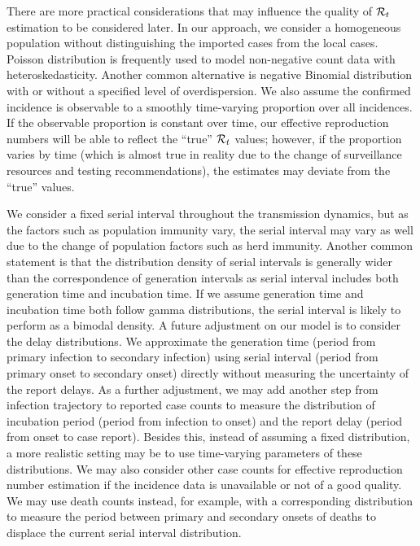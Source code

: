 


There are more practical considerations that may influence the quality of $\mathcal{R}_t$ estimation to be considered later. 
In our approach, we consider a homogeneous population without distinguishing the imported cases from the local cases. 
Poisson distribution is frequently used to model non-negative count data with heteroskedasticity. Another common alternative is negative Binomial distribution with or without a specified level of overdispersion. 
%
We also assume the confirmed incidence is observable to a smoothly time-varying proportion over all incidences. If the observable proportion is constant over time, our effective reproduction numbers will be able to reflect the ``true'' $\mathcal{R}_t$ values; however, if the proportion varies by time (which is almost true in reality due to the change of surveillance resources and testing recommendations), the estimates may deviate from the ``true'' values. 

We consider a fixed serial interval throughout the transmission dynamics, but as the factors such as population immunity vary, the serial interval may vary as well due to the change of population factors such as herd immunity. %
Another common statement is that the distribution density of serial intervals is generally wider than the correspondence of generation intervals as serial interval includes both generation time and incubation time. If we assume generation time and incubation time both follow gamma distributions, the serial interval is likely to perform as a bimodal density. 
A future adjustment on our model is to consider the delay distributions. We approximate the generation time (period from primary infection to secondary infection) using serial interval (period from primary onset to secondary onset) directly without measuring the uncertainty of the report delays. As a further adjustment, we may add another step from infection trajectory to reported case counts to measure the distribution of incubation period (period from infection to onset) and the report delay (period from onset to case report). Besides this, instead of assuming a fixed distribution, a more realistic setting may be to use time-varying parameters of these distributions. 
We may also consider other case counts for effective reproduction number estimation if the incidence data is unavailable or not of a good quality. We may use death counts instead, for example, with a corresponding distribution to measure the period between primary and secondary onsets of deaths to displace the current serial interval distribution. 


